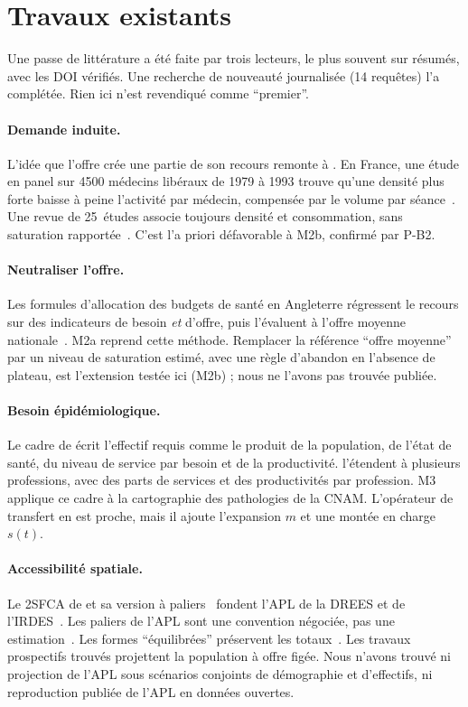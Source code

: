 \documentclass[11pt]{article}
\begin{document}
\section{Travaux existants}\label{sec:litterature}
Une passe de littérature a été faite par trois lecteurs, le plus souvent sur résumés, avec les DOI vérifiés. Une
recherche de nouveauté journalisée (14 requêtes) l'a complétée. Rien ici n'est revendiqué comme \enquote{premier}.

\paragraph{Demande induite.} L'idée que l'offre crée une partie de son recours remonte à \citet{evans1974}. En France,
une étude en panel sur \num{4500} médecins libéraux de 1979 à 1993 trouve qu'une densité plus forte baisse à peine
l'activité par médecin, compensée par le volume par séance~\citep{delattre2003}. Une revue de 25~études associe
toujours densité et consommation, sans saturation rapportée~\citep{leonard2009}. C'est l'a priori défavorable à M2b,
confirmé par P-B2.

\paragraph{Neutraliser l'offre.} Les formules d'allocation des budgets de santé en Angleterre régressent le recours sur
des indicateurs de besoin \emph{et} d'offre, puis l'évaluent à l'offre moyenne nationale~\citep{carrhill1994,
gravelle2003}. M2a reprend cette méthode. Remplacer la référence \enquote{offre moyenne} par un niveau de saturation
estimé, avec une règle d'abandon en l'absence de plateau, est l'extension testée ici (M2b) ; nous ne l'avons pas
trouvée publiée.

\paragraph{Besoin épidémiologique.} Le cadre de \citet{birch2007} écrit l'effectif requis comme le produit de la
population, de l'état de santé, du niveau de service par besoin et de la productivité.
\citet{mackenzie2019} l'étendent à plusieurs professions, avec des parts de services et des productivités par
profession. M3 applique ce cadre à la cartographie des pathologies de la CNAM. L'opérateur de transfert en est proche,
mais il ajoute l'expansion $m$ et une montée en charge $s(t)$.

\paragraph{Accessibilité spatiale.} Le 2SFCA de \citet{luowang2003} et sa version à paliers~\citep{luo2009} fondent
l'APL de la DREES et de l'IRDES~\citep{barlet2012,vergier2017}. Les paliers de l'APL sont une convention négociée, pas
une estimation~\citep{vergier2017}. Les formes \enquote{équilibrées} préservent les totaux~\citep{paez2019}. Les
travaux prospectifs trouvés projettent la population à offre figée. Nous n'avons trouvé ni projection de l'APL sous
scénarios conjoints de démographie et d'effectifs, ni reproduction publiée de l'APL en données ouvertes.
\end{document}
